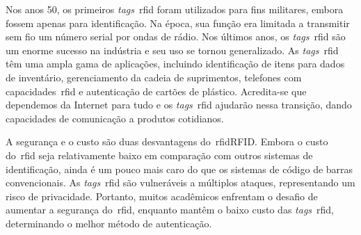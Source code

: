 Nos anos 50, os primeiros \textit{tags}~\acrshort{rfid} foram utilizados para
fins militares, embora fossem apenas para identificação.
Na época, sua função era limitada a transmitir sem fio um número serial
por ondas de rádio.
Nos últimos anos, os \textit{tags}~\acrshort{rfid} são um enorme sucesso na
indústria e seu uso se tornou generalizado.
As \textit{tags}~\acrshort{rfid} têm uma ampla gama de aplicações, incluindo
identificação de itens para dados de inventário, gerenciamento da cadeia de
suprimentos, telefones com capacidades~\acrshort{rfid} e autenticação de cartões
de plástico.
Acredita-se que dependemos da Internet para tudo e os \textit{tags}~\acrshort{rfid}
ajudarão nessa transição, dando capacidades de comunicação a produtos
cotidianos\cite{idrus2013}.

A segurança e o custo são duas desvantagens do~\acrshort{rfid}RFID.
Embora o custo do~\acrshort{rfid} seja relativamente baixo em comparação com
outros sistemas de identificação, ainda é um pouco mais caro do que os sistemas
de código de barras convencionais.
As \textit{tags}~\acrshort{rfid} são vulneráveis a múltiplos ataques, representando
um risco de privacidade.
Portanto, muitos acadêmicos enfrentam o desafio de aumentar a segurança do~\acrshort{rfid},
enquanto mantêm o baixo custo das \textit{tags}~\acrshort{rfid}, determinando o
melhor método de autenticação\cite{jadhao2018}.